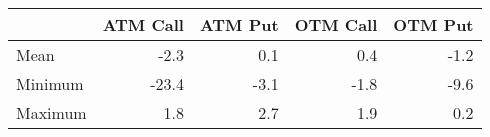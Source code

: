 \begin{tabular}{lrrrr}
\hline
         &   ATM Call &   ATM Put &   OTM Call &   OTM Put \\
\hline
 Mean    &       -2.3 &       0.1 &        0.4 &      -1.2 \\
 Minimum &      -23.4 &      -3.1 &       -1.8 &      -9.6 \\
 Maximum &        1.8 &       2.7 &        1.9 &       0.2 \\
\hline
\end{tabular}